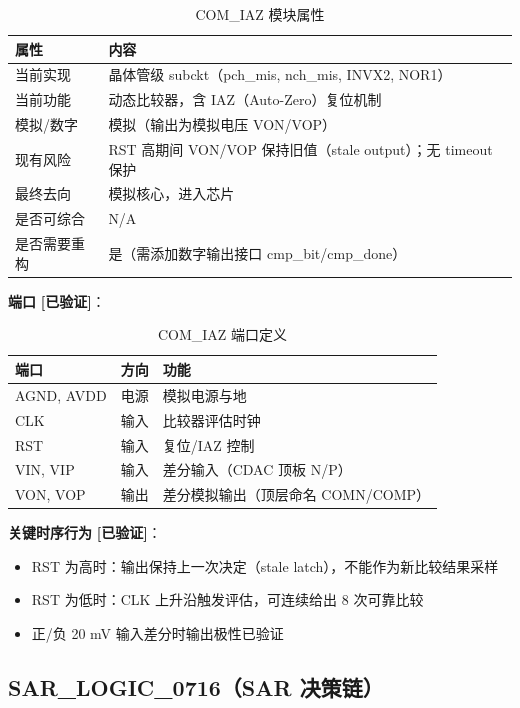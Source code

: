 \documentclass[UTF8,a4paper,11pt]{ctexart}
\newcommand{\verified}{\textcolor{verifiedgreen}{\textbf{[已验证]}}}
\begin{document}
\begin{table}[H]
\centering
\caption{COM\_IAZ 模块属性}
\label{tab:com-attr}
\begin{tabular}{ll}
\toprule
属性 & 内容 \\
\midrule
当前实现   & 晶体管级 subckt（pch\_mis, nch\_mis, INVX2, NOR1） \\
当前功能   & 动态比较器，含 IAZ（Auto-Zero）复位机制 \\
模拟/数字  & 模拟（输出为模拟电压 VON/VOP） \\
现有风险   & RST 高期间 VON/VOP 保持旧值（stale output）；无 timeout 保护 \\
最终去向   & 模拟核心，进入芯片 \\
是否可综合 & N/A \\
是否需要重构 & 是（需添加数字输出接口 cmp\_bit/cmp\_done） \\
\bottomrule
\end{tabular}
\end{table}

\textbf{端口} \verified：

\begin{table}[H]
\centering
\caption{COM\_IAZ 端口定义}
\label{tab:com-ports}
\begin{tabular}{lll}
\toprule
端口 & 方向 & 功能 \\
\midrule
AGND, AVDD & 电源 & 模拟电源与地 \\
CLK        & 输入 & 比较器评估时钟 \\
RST        & 输入 & 复位/IAZ 控制 \\
VIN, VIP   & 输入 & 差分输入（CDAC 顶板 N/P） \\
VON, VOP   & 输出 & 差分模拟输出（顶层命名 COMN/COMP） \\
\bottomrule
\end{tabular}
\end{table}

\textbf{关键时序行为} \verified：
\begin{itemize}[leftmargin=2em]
\item RST 为高时：输出保持上一次决定（stale latch），不能作为新比较结果采样
\item RST 为低时：CLK 上升沿触发评估，可连续给出 8 次可靠比较
\item 正/负 20 mV 输入差分时输出极性已验证
\end{itemize}

\subsection{SAR\_LOGIC\_0716（SAR 决策链）}
\end{document}
